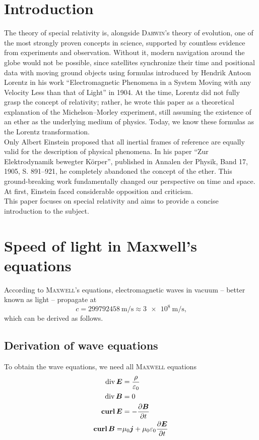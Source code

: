\documentclass[12pt,
               open=any,
               twoside,
               a4paper,
               titlepage,
               bibliography=totoc,
               xcolor=dvipsnames,
               ]{scrartcl}
\theoremstyle{definition}
\theoremstyle{definition}
\begin{document}
	\section{Introduction}
	\label{sec:introduction}
	
		The theory of special relativity is, alongside \textsc{Darwin}'s theory of evolution, one of the most strongly proven concepts in science, supported by countless evidence from experiments and observation. Without it, modern navigation around the globe would not be possible, since satellites synchronize their time and positional data with moving ground objects using formulas introduced by Hendrik Antoon Lorentz in his work “Electromagnetic Phenomena in a System Moving with any Velocity Less than that of Light” in 1904. At the time, Lorentz did not fully grasp the concept of relativity; rather, he wrote this paper as a
		theoretical explanation of the Michelson–Morley experiment, still assuming the existence
		of an ether as the underlying medium of physics. Today, we know these formulas as the
		Lorentz transformation.\\
		Only Albert Einstein proposed that all inertial frames of reference are equally valid for the description of physical phenomena. In his paper “Zur Elektrodynamik bewegter Körper”, published in Annalen der Physik, Band 17, 1905, S. 891–921, he completely abandoned the concept of the ether. This ground-breaking work fundamentally changed our perspective on time and space. At first, Einstein faced considerable opposition and criticism.\\
		This paper focuses on special relativity and aims to provide a concise introduction to the subject.
	
	\section{Speed of light in Maxwell's equations}
	\label{sec:maxwell}
	
		According to \textsc{Maxwell}'s equations, electromagnetic waves in vacuum -- better known as light -- propagate at 
		$$c = \SI{299792458}{\meter\per\second} \approx \SI{3e8}{\meter\per\second}\text{,}$$
		which can be derived as follows.
			
		\subsection{Derivation of wave equations}
		\label{subsec:derivationwaveequation}
		
			To obtain the wave equations, we need all \textsc{Maxwell} equations
			\begin{align}
				\operatorname*{div} \boldsymbol{E} & = \frac{\rho}{\varepsilon_0} \\
				\operatorname*{div} \boldsymbol{B} & = 0 \\
				\operatorname*{\mathbf{curl}} \boldsymbol{E} & = -\frac{\partial \boldsymbol{B}}{\partial t} \\
				\operatorname*{\mathbf{curl}} \boldsymbol{B} = & \mu_0 \boldsymbol{j} + \mu_0\varepsilon_0 \frac{\partial \boldsymbol{E}}{\partial t}
			\end{align}
			
\end{document}
